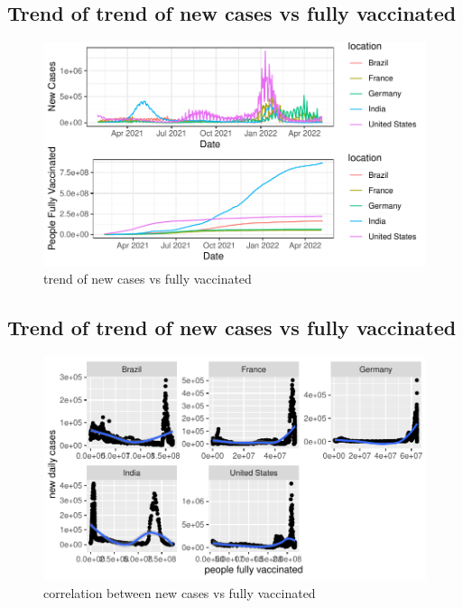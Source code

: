 \documentclass[11pt,a4paper,]{article}
\begin{document}
\subsection*{Trend of trend of new cases vs fully vaccinated}

\begin{figure}

{\centering \includegraphics{report_files/figure-latex/figure4-1} 

}

\caption{trend of new cases vs fully vaccinated}\label{fig:figure4}
\end{figure}

\clearpage

\subsection*{Trend of trend of new cases vs fully vaccinated}

\begin{figure}

{\centering \includegraphics{report_files/figure-latex/figure5-1} 

}

\caption{correlation between new cases vs fully vaccinated}\label{fig:figure5}
\end{figure}
\end{document}
